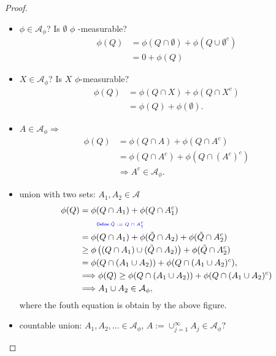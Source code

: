 \documentclass[../../note.tex]{subfiles}
\begin{document}
\begin{proof}
    \begin{itemize}
        \item $\phi \in \mathcal{A}_{\phi}$? Is $\emptyset$ $\phi$ -measurable? 
        \begin{align}
            \phi(Q)
            &= \phi(Q \cap \emptyset) + \phi(Q \cup \emptyset^c) \\
            &= 0+\phi(Q)
        \end{align}
        \item $X \in \mathcal{A}_{\phi}$? Is $X$ $\phi$-measurable? 
        \begin{align}
            \phi(Q)
            &= \phi(Q \cap X) + \phi(Q \cap X^c) \\
            &= \phi(Q) + \phi(\emptyset).
        \end{align}
        \item $A \in \mathcal{A}_{\phi} \Longrightarrow$
        \begin{align}
            \phi(Q)
            &= \phi(Q \cap A) + \phi(Q \cap A^c) \\
            &= \phi(Q \cap A^c) + \phi(Q \cap (A^c)^c) \\
            &\Longrightarrow A^c \in \mathcal{A}_{\phi}.
        \end{align} 
        \item union with two sets: $A_1, A_2 \in \mathcal{A}$ 
        \begin{align}
            \phi(Q)
            &= \phi(Q \cap A_1) + \phi(Q \cap A_1^c) \\
            &\qquad\text{\color{blue}{\tiny\sffamily Define $\tilde{Q} := Q \cap A_1^c$}} \nonumber \\
            &= \phi(Q \cap A_1) + \phi(\tilde{Q} \cap A_2) + \phi(\tilde{Q} \cap A_2^c) \\
            &\geq \phi\left((Q \cap A_1) \cup (\tilde{Q}\cap A_2)\right) + \phi(\tilde{Q} \cap A_2^c) \\
            &= \phi(Q \cap (A_1 \cup A_2)) + \phi(Q \cap (A_1 \cup A_2)^c),\\
            &\Longrightarrow \phi(Q) \geq \phi(Q \cap (A_1 \cup A_2)) + \phi(Q \cap (A_1 \cup A_2)^c) \\
            &\Longrightarrow A_1 \cup A_2 \in \mathcal{A}_{\phi},
        \end{align}
        where the fouth equation is obtain by the above figure.
        \item countable union: $A_1,A_2,\dots \in \mathcal{A}_{\phi}$, $A:= \cup_{j=1}^{\infty} A_j \in \mathcal{A}_{\phi}$?

\end{itemize}
\end{proof}
\end{document}
